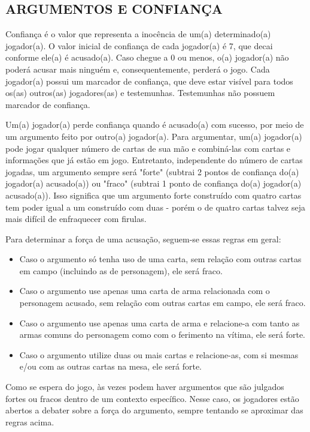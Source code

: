 \documentclass[a4paper, 11pt]{article}
\begin{document}
\subsection*{ARGUMENTOS E CONFIANÇA}

	Confiança é o valor que representa a inocência de um(a) determinado(a) jogador(a). O valor inicial de confiança de cada jogador(a) é 7, que decai conforme ele(a) é acusado(a). Caso chegue a 0 ou menos, o(a) jogador(a) não poderá acusar mais ninguém e, consequentemente, perderá o jogo. Cada jogador(a) possui um marcador de confiança, que deve estar visível para todos os(as) outros(as) jogadores(as) e testemunhas. Testemunhas não possuem marcador de confiança.

	Um(a) jogador(a) perde confiança quando é acusado(a) com sucesso, por meio de um argumento feito por outro(a) jogador(a). Para argumentar, um(a) jogador(a) pode jogar qualquer número de cartas de sua mão e combiná-las com cartas e informações que já estão em jogo. Entretanto, independente do número de cartas jogadas, um argumento sempre será "forte" (subtrai 2 pontos de confiança do(a) jogador(a) acusado(a)) ou "fraco" (subtrai 1 ponto de confiança do(a) jogador(a) acusado(a)). Isso significa que um argumento forte construído com quatro cartas tem poder igual a um construído com duas - porém o de quatro cartas talvez seja mais difícil de enfraquecer com firulas.

	Para determinar a força de uma acusação, seguem-se essas regras em geral:
	\begin{itemize}
		\item Caso o argumento só tenha uso de uma carta, sem relação com outras cartas em campo (incluindo as de personagem), ele será fraco.

		\item Caso o argumento use apenas uma carta de arma relacionada com o personagem acusado, sem relação com outras cartas em campo, ele será fraco.

		\item Caso o argumento use apenas uma carta de arma e relacione-a com tanto as armas comuns do personagem como com o ferimento na vítima, ele será forte.

		\item Caso o argumento utilize duas ou mais cartas e relacione-as, com si mesmas e/ou com as outras cartas na mesa, ele será forte.
	\end{itemize}

	Como se espera do jogo, às vezes podem haver argumentos que são julgados fortes ou fracos dentro de um contexto específico. Nesse caso, os jogadores estão abertos a debater sobre a força do argumento, sempre tentando se aproximar das regras acima.
\end{document}
